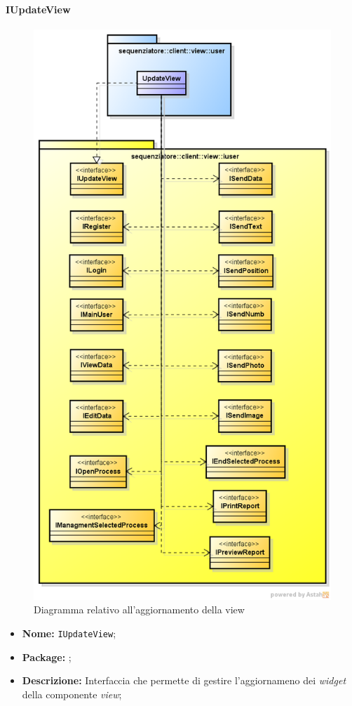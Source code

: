 \paragraph{IUpdateView}
\begin{figure}[H] \centering \includegraphics[scale=0.5]
{./pack/UpdateView.png} \caption{Diagramma relativo all'aggiornamento della view}
\end{figure}
\begin{itemize}
\item \textbf{Nome:} \texttt{IUpdateView};
\item \textbf{Package:} \texttt{\iViewUser{}};
\item \textbf{Descrizione:} Interfaccia che permette di gestire l’aggiornameno dei \textit{widget} della componente \textit{view};
\end{itemize}

